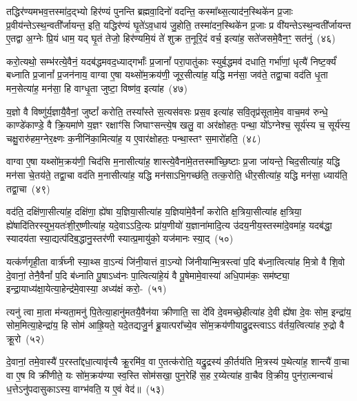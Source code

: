 तद्धिर॑ण्यमभव॒त्तस्मा॑द॒द्भ्यो हिर॑ण्यं पुनन्ति ब्रह्मवा॒दिनो॑ वदन्ति॒ कस्मा᳚थ्स॒त्याद॑न॒स्थिके॑न प्र॒जाः प्र॒वीय॑न्ते\-ऽ\-स्थ॒न्वती᳚र्जायन्त॒ इति॒ यद्धिर॑ण्यं घृ॒ते॑\-ऽव॒धाय॑ जु॒होति॒ तस्मा॑दन॒स्थिके॑न प्र॒जाः प्र वी॑यन्ते\-ऽस्थ॒न्वती᳚र्जायन्त ए॒तद्वा अ॒ग्नेः प्रि॒यं धाम॒ यद् घृ॒तं तेजो॒ हिर॑ण्यमि॒यं ते॑ शुक्र त॒नूरि॒दं वर्च॒ इत्या॑ह॒ सते॑जसमे॒वैन॒ꣳ॒ सत॑नुं~(४६)\ip

करो॒त्यथो॒ सम्भ॑रत्ये॒वैनं॒ यदब॑द्धमवद॒ध्याद्गर्भाः᳚ प्र॒जानां᳚ परा॒पातु॑काः स्युर्ब॒द्धमव॑ दधाति॒ गर्भा॑णां॒ धृत्यै॑ निष्ट॒र्क्यं॑ बध्नाति प्र॒जानां᳚ प्र॒जन॑नाय॒ वाग्वा ए॒षा यथ्सो॑म॒क्रय॑णी॒ जूर॒सीत्या॑ह॒ यद्धि मन॑सा॒ जव॑ते॒ तद्वा॒चा वद॑ति धृ॒ता मन॒सेत्या॑ह॒ मन॑सा॒ हि वाग्धृ॒ता जुष्टा॒ विष्ण॑व॒ इत्या॑ह~(४७)\ip

य॒ज्ञो वै विष्णु॑र्य॒ज्ञायै॒वैनां॒ जुष्टां᳚ करोति॒ तस्या᳚स्ते स॒त्यस॑वसः प्रस॒व इत्या॑ह सवि॒तृप्र॑सूतामे॒व वाच॒मव॑ रुन्धे॒ काण्डे॑काण्डे॒ वै क्रि॒यमा॑णे य॒ज्ञꣳ रक्षाꣳ॑सि जिघाꣳसन्त्ये॒ष खलु॒ वा अर॑क्षोहतः॒ पन्था॒ यो᳚\-ऽग्नेश्च॒ सूर्य॑स्य च॒ सूर्य॑स्य॒ चक्षु॒रारु॑हम॒ग्नेर॒क्ष्णः क॒नीनि॑का॒मित्या॑ह॒ य ए॒वार॑क्षोहतः॒ पन्था॒स्तꣳ स॒मारो॑हति॒~(४८)\ip

वाग्वा ए॒षा यथ्सो॑म॒क्रय॑णी॒ चिद॑सि म॒नासीत्या॑ह॒ शास्त्ये॒वैना॑मे॒तत्तस्मा᳚च्छि॒ष्टाः प्र॒जा जा॑यन्ते॒ चिद॒सीत्या॑ह॒ यद्धि मन॑सा चे॒तय॑ते॒ तद्वा॒चा वद॑ति म॒नासीत्या॑ह॒ यद्धि मन॑साऽभि॒गच्छ॑ति॒ तत्क॒रोति॒ धीर॒सीत्या॑ह॒ यद्धि मन॑सा॒ ध्याय॑ति॒ तद्वा॒चा~(४९)\ip

वद॑ति॒ दक्षि॑णा॒सीत्या॑ह॒ दक्षि॑णा॒ ह्ये॑षा य॒ज्ञिया॒सीत्या॑ह य॒ज्ञिया॑मे॒वैनां᳚ करोति क्ष॒त्रिया॒सीत्या॑ह क्ष॒त्रिया॒ ह्ये॑षादि॑तिरस्युभ॒यतः॑शी॒र्॒\mbox{}ष्णीत्या॑ह॒ यदे॒वा\-ऽऽ\-दि॒त्यः प्रा॑य॒णीयो॑ य॒ज्ञाना॑मादि॒त्य उ॑दय॒नीय॒स्तस्मा॑दे॒वमा॑ह॒ यदब॑द्धा॒ स्यादय॑ता स्या॒द्यत्प॑दिब॒द्धानु॒स्तर॑णी स्यात्प्र॒मायु॑को॒ यज॑मानः स्या॒द्~(५०)\ip

यत्क॑र्णगृही॒ता वार्त्र॑घ्नी स्या॒थ्स वा॒ऽन्यं जि॑नी॒यात्तं वा॒ऽन्यो जि॑नीयान्मि॒त्रस्त्वा॑ प॒दि ब॑ध्ना॒त्वित्या॑ह मि॒त्रो वै शि॒वो दे॒वानां॒ तेनै॒वैनां᳚ प॒दि ब॑ध्नाति पू॒षा\-ऽध्व॑नः पा॒त्वित्या॑हे॒यं वै पू॒षेमामे॒वास्या॑ अधि॒पाम॑कः॒ सम॑ष्ट्या॒ इन्द्रा॒याध्य॑क्षा॒येत्या॒हेन्द्र॑मे॒वास्या॒ अध्य॑क्षं करो॒-~(५१)\ip

त्यनु॑ त्वा मा॒ता म॑न्यता॒मनु॑ पि॒तेत्या॒हानु॑मतयै॒वैन॑या क्रीणाति॒ सा दे॑वि दे॒वमच्छे॒हीत्या॑ह दे॒वी ह्ये॑षा दे॒वः सोम॒ इन्द्रा॑य॒ सोम॒मित्या॒हेन्द्रा॑य॒ हि सोम॑ आह्रि॒यते॒ यदे॒तद्यजु॒र्न ब्रू॒यात्परा᳚च्ये॒व सो॑म॒क्रय॑णीयाद्रु॒द्रस्त्वाऽऽ व॑र्तय॒त्वित्या॑ह रु॒द्रो वै क्रू॒रो~(५२)\ip

दे॒वानां॒ तमे॒वास्यै॑ प॒रस्ता᳚द्दधा॒त्यावृ॑त्त्यै क्रू॒रमि॑व॒ वा ए॒तत्क॑रोति॒ यद्रु॒द्रस्य॑ की॒र्तय॑ति मि॒त्रस्य॑ प॒थेत्या॑ह॒ शान्त्यै॑ वा॒चा वा ए॒ष वि क्री॑णीते॒ यः सो॑म॒क्रय॑ण्या स्व॒स्ति सोम॑सखा॒ पुन॒रेहि॑ स॒ह र॒य्येत्या॑ह वा॒चैव वि॒क्रीय॒ पुन॑रा॒त्मन्वाचं॑ ध॒त्ते\-ऽनु॑पदासुका\-ऽस्य॒ वाग्भ॑वति॒ य ए॒वं वेद॑॥~(५३)\ip

